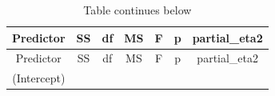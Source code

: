 \documentclass[
]{book}
\begin{document}
\begin{longtable}[]{@{}ccccccc@{}}
\caption{Table continues below}\tabularnewline
\toprule
\begin{minipage}[b]{0.21\columnwidth}\centering
Predictor\strut
\end{minipage} & \begin{minipage}[b]{0.11\columnwidth}\centering
SS\strut
\end{minipage} & \begin{minipage}[b]{0.07\columnwidth}\centering
df\strut
\end{minipage} & \begin{minipage}[b]{0.10\columnwidth}\centering
MS\strut
\end{minipage} & \begin{minipage}[b]{0.09\columnwidth}\centering
F\strut
\end{minipage} & \begin{minipage}[b]{0.07\columnwidth}\centering
p\strut
\end{minipage} & \begin{minipage}[b]{0.15\columnwidth}\centering
partial\_eta2\strut
\end{minipage}\tabularnewline
\midrule
\endfirsthead
\toprule
\begin{minipage}[b]{0.21\columnwidth}\centering
Predictor\strut
\end{minipage} & \begin{minipage}[b]{0.11\columnwidth}\centering
SS\strut
\end{minipage} & \begin{minipage}[b]{0.07\columnwidth}\centering
df\strut
\end{minipage} & \begin{minipage}[b]{0.10\columnwidth}\centering
MS\strut
\end{minipage} & \begin{minipage}[b]{0.09\columnwidth}\centering
F\strut
\end{minipage} & \begin{minipage}[b]{0.07\columnwidth}\centering
p\strut
\end{minipage} & \begin{minipage}[b]{0.15\columnwidth}\centering
partial\_eta2\strut
\end{minipage}\tabularnewline
\midrule
\endhead
\begin{minipage}[t]{0.21\columnwidth}\centering
(Intercept)\strut
\end{minipage} & \begin{minipage}[t]{0.11\columnwidth}\centering

\end{minipage}
\end{longtable}
\end{document}
